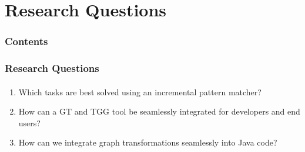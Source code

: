 
\section{Research Questions}
	\begin{frame}
		\frametitle{Contents}
		\tableofcontents[currentsection]
	\end{frame}
	\begin{frame}
		\frametitle{Research Questions}
		\framesubtitle{}
		\begin{enumerate}
			\item Which tasks are best solved using an incremental pattern matcher?
			\item How can a GT and TGG tool be seamlessly integrated for developers and end users?
			\item How can we integrate graph transformations seamlessly into Java code?
		\end{enumerate}
	\end{frame}
